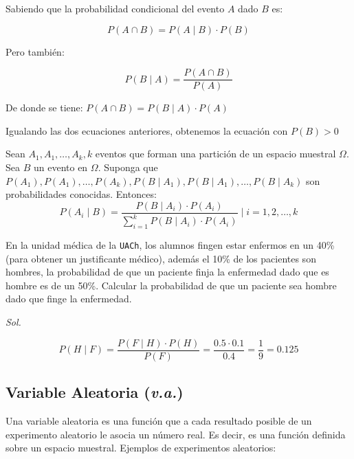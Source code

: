 Sabiendo que la probabilidad condicional
del evento $A$ dado $B$ es:

\begin{equation*}
    P( A\cap B)=P( A\mid B)\cdot P(B)
\end{equation*}

Pero también:

\begin{equation*}
    P(B\mid  A)=\frac{P( A\cap B)}{P(A)}
\end{equation*}

De donde se tiene: $P( A\cap B)=P(B\mid  A)\cdot P(A)$

Igualando las dos ecuaciones anteriores, obtenemos la ecuación con $P(B)>0$

Sean $A_1, A_1,\dots,A_k, k$ eventos que forman una partición de un espacio muestral $\Omega$. Sea $B$ un evento en $\Omega$.
Suponga que $P(A_1),P(A_1),\dots,P(A_k), P(B\mid A_1),P(B\mid  A_1),\dots,P(B\mid A_k)$ son probabilidades conocidas. Entonces:
\begin{equation}
    P( A_i\mid B)=\frac{P(B\mid  A_i)\cdot P(A_i)}{\sum_{i=1}^k P(B\mid A_i)\cdot P(A_i)}\mid i=1,2,\dots, k
\end{equation}

\begin{example}
    En la unidad médica de la \texttt{UACh}, los alumnos fingen estar
    enfermos en un 40\% (para obtener un justificante médico),
    además el 10\% de los pacientes son hombres, la
    probabilidad de que un paciente finja la enfermedad dado
    que es hombre es de un 50\%. Calcular la probabilidad de
    que un paciente sea hombre dado que finge la enfermedad.
\end{example}

\textit{ Sol. }

\begin{equation*}
    P(H \mid  F)=\frac{P(F\mid  H )\cdot P(H)}{P(F)}=\frac{0.5\cdot 0.1}{0.4}=\frac{1}{9}=0.125
\end{equation*}

\subsection{Variable Aleatoria (\textit{v.a.})}

Una variable aleatoria es una función que a cada
resultado posible de un experimento aleatorio le
asocia un número real. Es decir, es una función
definida sobre un espacio muestral.
Ejemplos de experimentos aleatorios:

